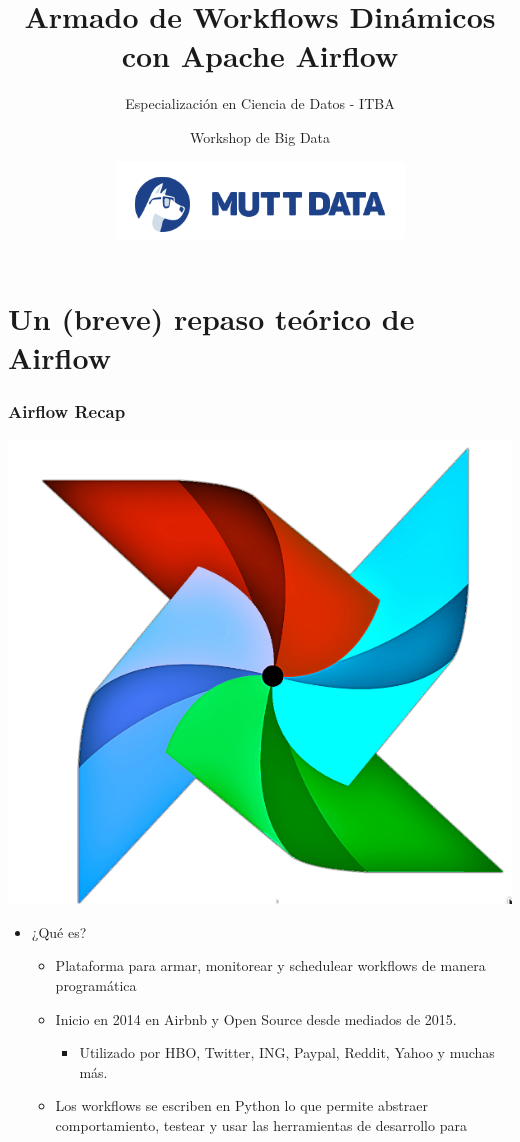 \documentclass[leqno, 10pt, envcountsect]{beamer}
\title[Intro Airflow]{Armado de Workflows Dinámicos con Apache Airflow}
\subtitle{Especialización en Ciencia de Datos - ITBA}
\author[]{Workshop de Big Data}
\institute[]{17 de Diciembre de 2020}
\date[]{\includegraphics[scale=0.35]{logo_mutt.png}}
\numberwithin{equation}{section}
\theoremstyle{definition}
\theoremstyle{example}
\numberwithin{figure}{section}
\numberwithin{table}{section}
\let\olditem\item
\renewcommand{\item}{%
\olditem\vspace{1pt}}
\begin{document}
\frame[plain]{\titlepage}

\section{Un (breve) repaso teórico de Airflow}
\label{sec:un_breve_repaso_teorico_de_airflow}

\begin{frame}[fragile=singleslide]
  \frametitle{Airflow Recap}
  \begin{center}
    \includegraphics[scale=0.09]{airflow.png}
  \end{center}
  \begin{itemize}
    \item ¿Qué es?
    \begin{itemize}
      \item Plataforma para armar, monitorear y schedulear workflows de manera programática
      \item Inicio en 2014 en Airbnb y Open Source desde mediados de 2015.
        \begin{itemize}
          \item Utilizado por HBO, Twitter, ING, Paypal, Reddit, Yahoo y muchas más.
        \end{itemize}
      \item Los workflows se escriben en Python lo que permite abstraer
        comportamiento, testear y usar las herramientas de desarrollo para

\end{itemize}
\end{itemize}
\end{frame}
\end{document}
